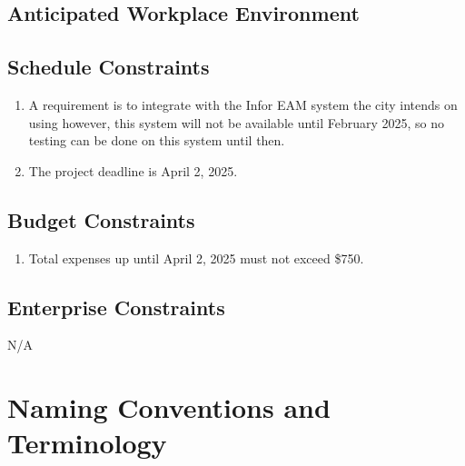 \documentclass[12pt]{article}
\begin{document}
\subsection{Anticipated Workplace Environment}

\subsection{Schedule Constraints}
\begin{enumerate} [{C-SCH}1.]
  \item A requirement is to integrate with the Infor EAM system the city intends
  on using however, this system will not be available until February 2025, so no
  testing can be done on this system until then.

  \item The project deadline is April 2, 2025.
\end{enumerate}

\subsection{Budget Constraints}
\begin{enumerate} [{C-BDG}1.]
  \item Total expenses up until April 2, 2025 must not exceed \$750.
\end{enumerate}

\subsection{Enterprise Constraints}
N/A

\section{Naming Conventions and Terminology}
\end{document}
